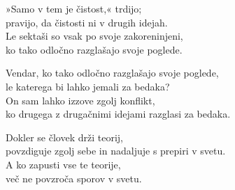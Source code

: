 
\clearpage

»Samo v tem je čistost,« trdijo;\\
pravijo, da čistosti ni v drugih idejah.\\
Le sektaši so vsak po svoje zakoreninjeni,\\
ko tako odločno razglašajo svoje poglede.

Vendar, ko tako odločno razglašajo svoje poglede,\\
le katerega bi lahko jemali za bedaka?\\
On sam lahko izzove zgolj konflikt,\\
ko drugega z drugačnimi idejami razglasi za bedaka.

Dokler se človek drži teorij,\\
povzdiguje zgolj sebe in nadaljuje s prepiri v svetu.\\
A ko zapusti vse te teorije,\\
več ne povzroča sporov v svetu.

